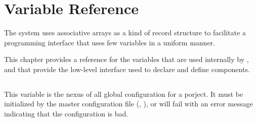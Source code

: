%
%
%
%
\chapter{Variable Reference}\label{chap:variables}

The \lmsbw system uses associative arrays as a kind of record
structure to facilitate a programming interface that uses few
variables in a uniform manner.

This chapter provides a reference for the variables that are used
internally by \lmsbw, and that provide the low-level interface used to
declare and define components.

\begin{center}\end{center}

\section{\lmsbwconfiguration}\label{variables:lmsbw-configuration}

This variable is the nexus of all global configuration for a porject.
It must be initialized by the master configuration file
(, ), or
\lmsbw will fail with an error message indicating that the
configuration is bad.

